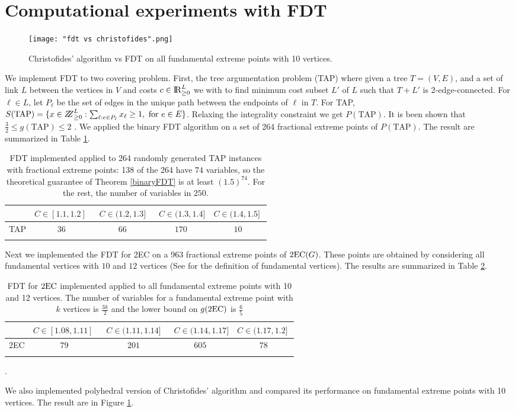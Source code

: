 \section{Computational experiments with FDT}\label{experiment}
\begin{figure}[h!]
\centering
\texttt{[image: "fdt vs christofides".png]}
\caption{Christofides' algorithm vs FDT on all fundamental extreme points with 10 vertices.}
\label{fdtvschris}
\end{figure}
We implement FDT to two covering problem. First, the tree argumentation problem (TAP) where given a tree $T=(V,E)$, and a set of link $L$ between the vertices in $V$ and costs $c\in {\rm I\!R}^{L}_{\geq 0}$ we with to find minimum cost subset $L'$ of $L$ such that $T+L'$ is 2-edge-connected. For $\ell\in L$, let $P_\ell$ be the set of edges in the unique path between the endpoints of $\ell$ in $T$. For TAP, $S(\mbox{TAP})=\{x\in \bbbz^{L}_{\geq 0}: \sum_{\ell: e\in P_\ell}x_\ell \geq 1, \mbox{ for $e\in E$}\}$. Relaxing the integrality constraint we get $P(\mbox{TAP})$. It is been shown that $\frac{3}{2}\leq g({\mbox{TAP}})\leq 2$ \cite{fj,32gap}. We applied the binary FDT algorithm on a set of 264 fractional extreme points of $P(\mbox{TAP})$. The result are summarized in Table \ref{tableTAP}. 
\begin{table}[h]
	\centering
	  \begin{tabular}{c c c c c}
	  \toprule
	  	& $C\in [1.1,1.2]\;$ & $\;C\in (1.2,1.3]\;$ &
               $\;C\in (1.3,1.4]$ &\; $C\in (1.4,1.5]\;$ \\ \midrule
	  	TAP & $36$ & $66$ & $170$ & $10$\\  \bottomrule \\
	  \end{tabular}\caption{FDT implemented applied to 264 randomly generated TAP instances with fractional extreme points: 138 of the 264 have $74$ variables, so the theoretical guarantee of Theorem \ref{binaryFDT} is at least $(1.5)^{74}$. For the rest, the number of variables in $250$.}
	  \label{tableTAP}
\end{table}
\vspace*{-30pt}
Next we implemented the FDT for 2EC on a 963 fractional extreme points of $\operatorname{2EC}(G)$. These points are obtained by considering all fundamental vertices with $10$ and $12$ vertices (See \cite{CV} for the definition of fundamental vertices). The results are summarized in Table \ref{table2EC}. 
\begin{table}[h]
	\centering
	  \begin{tabular}{c c c c c}
	  	\toprule
	  	& $C\in [1.08,1.11]\;$ & $\;C\in (1.11,1.14]\;$ &
               $\;C\in (1.14,1.17]$ &\; $C\in (1.17,1.2]\;$ \\ \midrule
	  	2EC & $79$ & $201$ & $605$ & $78$ \\ \bottomrule\\
	  \end{tabular}	\caption{FDT for $\operatorname{2EC}$ implemented applied to all fundamental extreme points with 10 and 12 vertices. The number of variables for a fundamental extreme point with $k$ vertices is $\frac{3k}{2}$ and the lower bound on $g(\operatorname{2EC})$ is $\frac{6}{5}$}.
	  \label{table2EC}
\end{table}
\vspace*{-30pt}
We also implemented polyhedral version of Christofides' algorithm \cite{Wolsey1980} and compared its performance on fundamental extreme points with 10 vertices. The result are in Figure \ref{fdtvschris}.
